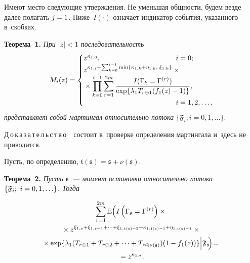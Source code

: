 \begin{multicols}{2}
Имеют место следующие утверждения. Не уменьшая общности, будем везде далее
полагать $j\hm=1$. Ниже~$I(\cdot)$ означает индикатор события, указанного в~скобках.


\smallskip

\noindent
\textbf{Теорема~1.}
\textit{ При $|z|<1$ последовательность}
  \begin{equation*}
    M_{i}(z)=
    \begin{cases}
      z^{\kappa_{1,0}}, & \hspace*{-33pt}i=0;\\
      z^{\kappa_{1,i}+ \sum\nolimits_{k=0}^{i-1}
        \min\{\kappa_{1,k}+\eta_{1,k},\;\xi_{1,k}\}}\times{}&\\
        {}\times 
     \displaystyle  \prod\limits_{k=0}^{i-1} \displaystyle \sum\limits_{r=1}^{2m}
      \fr{I(\Gamma_{k}=\Gamma^{(r)})}
      {\exp\{\lambda_{1}T_{r\oplus1}(f_{1}(z)-1)\}},&\\
      & \hspace*{-33pt}i=1,2,\ldots,
    \end{cases}
  \end{equation*}
  \textit{представляет собой мартингал относительно потока}
  $\{\mathfrak{F}_{i};i=0,1,\ldots\}$.

\smallskip

\noindent
Д\,о\,к\,а\,з\,а\,т\,е\,л\,ь\,с\,т\,в\,о\ \ состоит в~проверке определения мартингала и~здесь не приводится.

\smallskip

Пусть, по определению, $\mathfrak t(\mathfrak s)= \mathfrak s + \nu(\mathfrak{s})$.

\smallskip

\noindent
\textbf{Теорема~2.}
\textit{Пусть $\mathfrak s$~---  момент остановки относительно потока
  $\{\mathfrak{F}_{i};\ i\hm=0,1,\ldots\}$. Тогда}
  
  \vspace*{-6pt}
  
  \noindent
  \begin{multline}
    \sum\limits_{r=1}^{2m}\mathbb{E}\Bigl(
    I\left(\Gamma_{\mathfrak   s}=\Gamma^{(r)}\right)\times{}\\
    {}\times 
    z^{\xi_{1,\mathfrak s}+\xi_{1,\mathfrak  s+1}+\cdots +\xi_{1,\mathfrak {t}(\mathfrak s)-2}+
      \kappa_{1,\mathfrak t(\mathfrak s)-1}+\eta_{1,\mathfrak t(\mathfrak s)-1}}
    \times{}
    \\ 
    {}\times
    \exp\{\lambda_{1}(T_{r\oplus1}+T_{r\oplus2}+\cdots+
    T_{r\oplus\nu(\mathfrak s)}) (1-f_{1}(z))\}\Big|
    \mathfrak{F}_{\mathfrak s}\!\Bigr)\!={}\\
    {}=
    z^{\kappa_{1,\mathfrak  s}}.
    \label{AZ:eq:main-mart}
  \end{multline}



\end{multicols}
